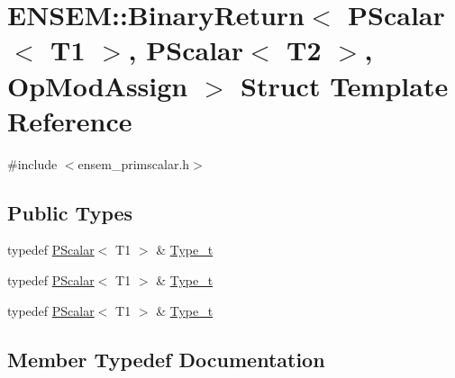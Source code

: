 \hypertarget{structENSEM_1_1BinaryReturn_3_01PScalar_3_01T1_01_4_00_01PScalar_3_01T2_01_4_00_01OpModAssign_01_4}{}\section{E\+N\+S\+EM\+:\+:Binary\+Return$<$ P\+Scalar$<$ T1 $>$, P\+Scalar$<$ T2 $>$, Op\+Mod\+Assign $>$ Struct Template Reference}
\label{structENSEM_1_1BinaryReturn_3_01PScalar_3_01T1_01_4_00_01PScalar_3_01T2_01_4_00_01OpModAssign_01_4}


{\ttfamily \#include $<$ensem\+\_\+primscalar.\+h$>$}

\subsection*{Public Types}
\begin{DoxyCompactItemize}
\item 
typedef \mbox{\hyperlink{classENSEM_1_1PScalar}{P\+Scalar}}$<$ T1 $>$ \& \mbox{\hyperlink{structENSEM_1_1BinaryReturn_3_01PScalar_3_01T1_01_4_00_01PScalar_3_01T2_01_4_00_01OpModAssign_01_4_a5881ef2b7460fedecc7cdf20e5f36799}{Type\+\_\+t}}
\item 
typedef \mbox{\hyperlink{classENSEM_1_1PScalar}{P\+Scalar}}$<$ T1 $>$ \& \mbox{\hyperlink{structENSEM_1_1BinaryReturn_3_01PScalar_3_01T1_01_4_00_01PScalar_3_01T2_01_4_00_01OpModAssign_01_4_a5881ef2b7460fedecc7cdf20e5f36799}{Type\+\_\+t}}
\item 
typedef \mbox{\hyperlink{classENSEM_1_1PScalar}{P\+Scalar}}$<$ T1 $>$ \& \mbox{\hyperlink{structENSEM_1_1BinaryReturn_3_01PScalar_3_01T1_01_4_00_01PScalar_3_01T2_01_4_00_01OpModAssign_01_4_a5881ef2b7460fedecc7cdf20e5f36799}{Type\+\_\+t}}
\end{DoxyCompactItemize}


\subsection{Member Typedef Documentation}
\mbox{\label{structENSEM_1_1BinaryReturn_3_01PScalar_3_01T1_01_4_00_01PScalar_3_01T2_01_4_00_01OpModAssign_01_4_a5881ef2b7460fedecc7cdf20e5f36799}} 
